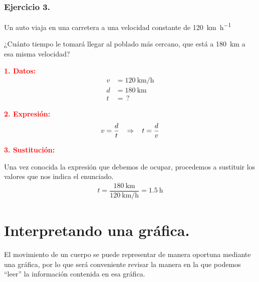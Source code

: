 \documentclass[14pt]{extarticle}
\newcommand{\textocolor}[2]{\textbf{\textcolor{#1}{#2}}}
\begin{document}
\subsubsection{Ejercicio 3.}

Un auto viaja en una carretera a una velocidad constante de \SI{120}{\kilo\meter\per\hour}

\vspace*{0.3cm}
¿Cuánto tiempo le tomará llegar al poblado más cercano, que está a \SI{180}{\kilo\meter} a esa misma velocidad?

\vspace*{0.3cm}
\begin{minipage}[t]{0.4\linewidth}
\textocolor{red}{1. Datos:}
\begin{align*}
v &= \SI{120}{\kilo\meter\per\hour} \\[0.5em]
d &= \SI{180}{\kilo\meter} \\[0.5em]
t &= \, ?
\end{align*}
\end{minipage}
\hspace{0.5cm}
\begin{minipage}[t]{0.4\linewidth}
\textocolor{red}{2. Expresión:}
\begin{eqnarray*}
\begin{aligned}
v = \dfrac{d}{t} \hspace{0.3cm} \Rightarrow \hspace{0.3cm} t = \dfrac{d}{v}
\end{aligned}
\end{eqnarray*}
\end{minipage}

\newpage
\textocolor{red}{3. Sustitución:}

Una vez conocida la expresión que debemos de ocupar, procedemos a sustituir los valores que nos indica el enunciado.
\begin{align*}
t = \dfrac{\SI{180}{\kilo\meter}}{\SI{120}{\kilo\meter\per\hour}} =  \SI{1.5}{\hour}
\end{align*}

\section{Interpretando una gráfica.}

El movimiento de un cuerpo se puede representar de manera oportuna mediante una gráfica,  por lo que será conveniente revisar la manera en la que podemos \enquote{leer} la información contenida en esa gráfica.
\end{document}
